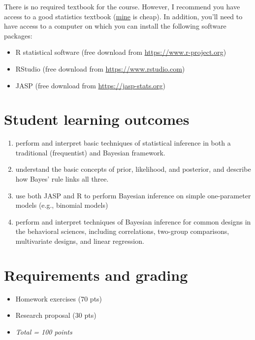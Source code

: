 \documentclass[10pt]{article}
\begin{document}
There is no required textbook for the course. However, I recommend you have access to a good statistics textbook (\href{https://www.amazon.com/Psychological-Statistics-Basics-Thomas-Faulkenberry-dp-1032020954/dp/1032020954}{mine} is cheap).  In addition, you'll need to have access to a computer on which you can install the following software packages:

\begin{itemize}
\item R statistical software (free download from \href{http://www.r-project.org}{https://www.r-project.org})
\item RStudio (free download from \href{http://www.rstudio.com}{https://www.rstudio.com})
\item JASP (free download from \url{https://jasp-stats.org})
\end{itemize}

\section*{Student learning outcomes}
\label{sec:orgb61f86d}

\begin{enumerate}
\item perform and interpret basic techniques of statistical inference in both a traditional (frequentist) and Bayesian framework.
\item understand the basic concepts of prior, likelihood, and posterior, and describe how Bayes' rule links all three.
\item use both JASP and R to perform Bayesian inference on simple one-parameter models (e.g., binomial models)
\item perform and interpret techniques of Bayesian inference for common designs in the behavioral sciences, including correlations, two-group comparisons, multivariate designs, and linear regression.
\end{enumerate}

\section*{Requirements and grading}
\label{sec:org2a87883}

\begin{itemize}
\item Homework exercises (70 pts)
\item Research proposal (30 pts)
\item \emph{Total = 100 points}
\end{itemize}
\end{document}
